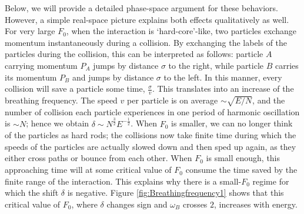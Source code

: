 \documentclass[a4paper, onecolumn]{revtex4-1}
\begin{document}
Below, we will provide a detailed phase-space argument for these behaviors.  However, a simple
real-space picture explains both effects qualitatively as well.  For very large $F_0$, when the
interaction is `hard-core'-like, two particles exchange momentum instantaneously during a collision.
By exchanging the labels of the particles during the collision, this can be interpreted as follows:
particle $A$ carrying momentum $P_A$ jumps by distance $\sigma$ to the right, while particle $B$
carries its momentum $P_B$ and jumps by distance $\sigma$ to the left.  In this manner, every
collision will save a particle some time, $\frac{\sigma}{v}$.  This translates into an increase of
the breathing frequency.  The speed $v$ per particle is on average $\sim\sqrt{E/N}$, and the number
of collision each particle experiences in one period of harmonic oscillation is $\sim N$; hence we
obtain $\delta\sim N^{\frac{3}{2}}E^{-\frac{1}{2}}$.  When $F_0$ is smaller, we can no longer think
of the particles as hard rods; the collisions now take finite time during which the speeds of the
particles are actually slowed down and then sped up again, as they either cross paths or bounce from
each other.  When $F_0$ is small enough, this approaching time will at some critical value of $F_0$
consume the time saved by the finite range of the interaction.  This explains why there is a
small-$F_0$ regime for which the shift $\delta$ is negative.  Figure \ref{fig:Breathingfrequency1}
shows that this critical value of $F_0$, where $\delta$ changes sign and $\omega_B$ crosses $2$,
increases with energy.
\end{document}
